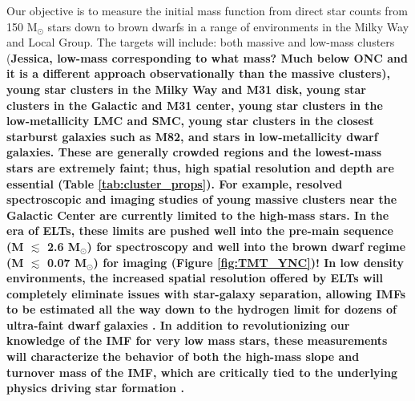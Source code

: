 \documentclass[11pt]{article}
\begin{document}
Our objective is to measure the initial mass function from direct star counts from 150 M$_{\odot}$ stars down to brown dwarfs in a range of environments in the Milky Way and Local Group. The targets will include:
both massive and low-mass clusters (\bf{Jessica, low-mass corresponding to what mass? Much below ONC and it is a different approach observationally than the massive clusters}),
young star clusters in the Milky Way and M31 disk,
young star clusters in the Galactic and M31 center,
young star clusters in the low-metallicity LMC and SMC,
young star clusters in the closest starburst galaxies such as M82, and 
stars in low-metallicity dwarf galaxies.
These are generally crowded regions and the lowest-mass stars are extremely faint; thus, high spatial resolution and depth are essential (Table \ref{tab:cluster_props}). For example, resolved spectroscopic and imaging studies of young massive clusters near the Galactic Center are currently limited to the high-mass stars. In the era of ELTs, these limits are pushed well into the pre-main sequence (M $\lesssim$ 2.6 M$_{\odot}$)
for spectroscopy and well into the brown dwarf regime (M $\lesssim$ 0.07 M$_{\odot}$) for imaging (Figure \ref{fig:TMT_YNC})! In low density environments, the increased spatial resolution offered by ELTs will completely eliminate issues with star-galaxy separation, allowing IMFs to be estimated all the way down to the hydrogen limit for dozens of ultra-faint dwarf galaxies \citep{Gennaro+18a, Gennaro+18b}. In addition to revolutionizing our knowledge of the IMF for very low mass stars, %
these measurements will characterize the behavior of both the high-mass slope and turnover mass of the IMF, which are critically tied to the underlying physics driving star formation \citep{Offner:2014,Krumholz:2014}.
\end{document}
